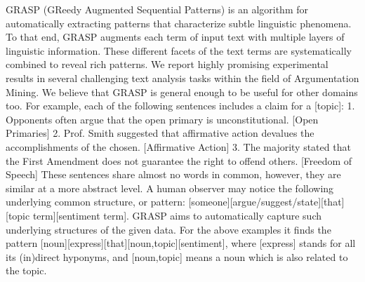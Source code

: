 GRASP (GReedy Augmented Sequential Patterns) is an algorithm for automatically extracting patterns that characterize subtle linguistic phenomena. To that end, GRASP augments each term of input text with multiple layers of linguistic information. These different facets of the text terms are systematically combined to reveal rich patterns. We report highly promising experimental results in several challenging text analysis tasks within the field of Argumentation Mining. We believe that GRASP is general enough to be useful for other domains too. For example, each of the following sentences includes a claim for a [topic]: 1. Opponents often argue that the open primary is unconstitutional. [Open Primaries] 2. Prof. Smith suggested that affirmative action devalues the accomplishments of the chosen. [Affirmative Action] 3. The majority stated that the First Amendment does not guarantee the right to offend others. [Freedom of Speech] These sentences share almost no words in common, however, they are similar at a more abstract level. A human observer may notice the following underlying common structure, or pattern: [someone][argue/suggest/state][that][topic term][sentiment term]. GRASP aims to automatically capture such underlying structures of the given data. For the above examples it finds the pattern [noun][express][that][noun,topic][sentiment], where [express] stands for all its (in)direct hyponyms, and [noun,topic] means a noun which is also related to the topic.
